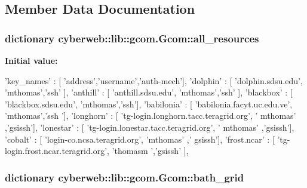 \subsection{\-Member \-Data \-Documentation}
\hypertarget{classcyberweb_1_1lib_1_1gcom_1_1_gcom_a723773d40b89c4248e251831aef183f8}{
\subsubsection[{all\-\_\-resources}]{\setlength{\rightskip}{0pt plus 5cm}dictionary {\bf cyberweb\-::lib\-::gcom.\-Gcom\-::all\-\_\-resources}}}\label{classcyberweb_1_1lib_1_1gcom_1_1_gcom_a723773d40b89c4248e251831aef183f8}
{\bfseries \-Initial value\-:}
\begin{DoxyCode}
{
                  'key_names'  : [ 'address','username','auth-mech'],
                  'dolphin'    : [ 'dolphin.sdsu.edu',  'mthomas','ssh' ],
                  'anthill'    : [ 'anthill.sdsu.edu',  'mthomas','ssh' ],
                  'blackbox'   : [ 'blackbox.sdsu.edu',  'mthomas','ssh'],
                  'babilonia'  : [ 'babilonia.facyt.uc.edu.ve',  'mthomas','ssh
      '],
                  'longhorn'   : [ 'tg-login.longhorn.tacc.teragrid.org', '
      mthomas' ,'gsissh'],
                  'lonestar'   : [ 'tg-login.lonestar.tacc.teragrid.org', '
      mthomas' ,'gsissh'],
                  'cobalt'     : [ 'login-co.ncsa.teragrid.org', 'mthomas' ,'
      gsissh'],
                  'frost.ncar' : [ 'tg-login.frost.ncar.teragrid.org', 'thomasm
      ','gsissh' ],
                }
\end{DoxyCode}
\hypertarget{classcyberweb_1_1lib_1_1gcom_1_1_gcom_a7a9884174cf426954d4263512ad5259c}{
\subsubsection[{bath\-\_\-grid}]{\setlength{\rightskip}{0pt plus 5cm}dictionary {\bf cyberweb\-::lib\-::gcom.\-Gcom\-::bath\-\_\-grid}}}\label{classcyberweb_1_1lib_1_1gcom_1_1_gcom_a7a9884174cf426954d4263512ad5259c}
